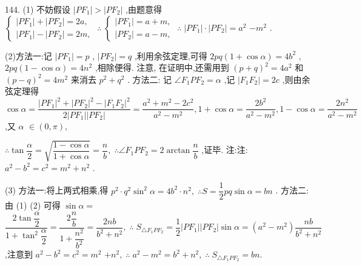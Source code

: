 144. (1) 不妨假设 $\left| {P{F}_{1}}\right|  > \left| {P{F}_{2}}\right|$ ,由题意得 $\left\{  {\begin{array}{l} \left| {P{F}_{1}}\right|  + \left| {P{F}_{2}}\right|  = {2a}, \\  \left| {P{F}_{1}}\right|  - \left| {P{F}_{2}}\right|  = {2m}, \end{array}\;\therefore \;\left\{  {\begin{array}{l} \left| {P{F}_{1}}\right|  = a + m, \\  \left| {P{F}_{2}}\right|  = a - m, \end{array}\;\therefore \;\left| {P{F}_{1}}\right|  \cdot  \left| {P{F}_{2}}\right|  = {a}^{2}}\right. }\right.$  $- {m}^{2}$ .

(2)方法一:记 $\left| {P{F}_{1}}\right|  = p$ , $\left| {P{F}_{2}}\right|  = q$ ,利用余弦定理,可得 ${2pq}\left( {1 + \cos \alpha }\right)  = 4{b}^{2}$ , ${2pq}\left( {1 - \cos \alpha }\right)  = 4{n}^{2}$ ,相除便得. 注意, 在证明中,还需用到 ${\left( p + q\right) }^{2} = 4{a}^{2}$ 和 ${\left( p - q\right) }^{2} = 4{m}^{2}$ 来消去 ${p}^{2} + {q}^{2}$ . 方法二: 记 $\angle {F}_{1}P{F}_{2} = \alpha$ ,记 $\left| {{F}_{1}{F}_{2}}\right|  = {2c}$ ,则由余弦定理得 $\cos \alpha  = \dfrac{{\left| P{F}_{1}\right| }^{2} + {\left| P{F}_{2}\right| }^{2} - {\left| {F}_{1}{F}_{2}\right| }^{2}}{2\left| {P{F}_{1}}\right| \left| {P{F}_{2}}\right| } = \dfrac{{a}^{2} + {m}^{2} - 2{c}^{2}}{{a}^{2} - {m}^{2}},1 + \cos \alpha  = \dfrac{2{b}^{2}}{{a}^{2} - {m}^{2}},1 - \cos \alpha  = \dfrac{2{n}^{2}}{{a}^{2} - {m}^{2}}$ ,又 $\alpha$  $\in  \left( {0,\pi }\right) ,$

$\therefore \tan \dfrac{\alpha }{2} = \sqrt{\dfrac{1 - \cos \alpha }{1 + \cos \alpha }} = \dfrac{n}{b},\;\therefore \angle {F}_{1}P{F}_{2} = 2\arctan \dfrac{n}{b}$ ,证毕. 注:注: ${a}^{2} - {b}^{2} = {c}^{2} = {m}^{2} + {n}^{2}$ .

(3) 方法一:将上两式相乘,得 ${p}^{2} \cdot  {q}^{2}{\sin }^{2}\alpha  = 4{b}^{2} \cdot  {n}^{2},\;\therefore S = \dfrac{1}{2}{pq}\sin \alpha  = {bn}$ . 方法二:由 (1) (2) 可得 $\sin \alpha  =$  $\dfrac{2\tan \dfrac{\alpha }{2}}{1 + {\tan }^{2}\dfrac{\alpha }{2}} = \dfrac{2\dfrac{n}{b}}{1 + \dfrac{{n}^{2}}{{b}^{2}}} = \dfrac{2nb}{{b}^{2} + {n}^{2}},\;\therefore \;{S}_{\bigtriangleup {F}_{1}P{F}_{2}} = \dfrac{1}{2}\left| {P{F}_{1}}\right| \left| {P{F}_{2}}\right| \sin \alpha  = \left( {{a}^{2} - {m}^{2}}\right) \dfrac{nb}{{b}^{2} + {n}^{2}}$ ,注意到 ${a}^{2} - {b}^{2} = {c}^{2} = {m}^{2}$  $+ {n}^{2},\;\therefore \;{a}^{2} - {m}^{2} = {b}^{2} + {n}^{2},\;\therefore \;{S}_{\bigtriangleup {F}_{1}P{F}_{2}} = {bn}.$

